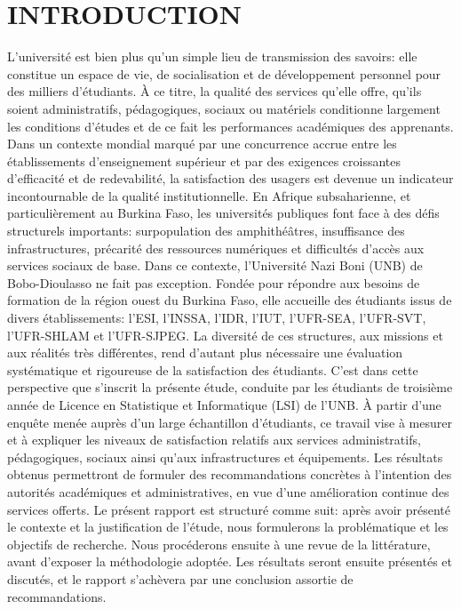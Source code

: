 \documentclass[
12pt,          %
a4paper,       %
oneside,      %
openright      %
]{report}          %
\begin{document}
		\chapter*{INTRODUCTION}
			L'université est bien plus qu'un simple lieu de transmission des savoirs: elle constitue un
		espace de vie, de socialisation et de développement personnel pour des milliers d'étudiants.
		À ce titre, la qualité des services qu'elle offre, qu'ils soient administratifs, pédagogiques, sociaux ou matériels conditionne largement les conditions d'études et de ce fait les performances académiques des apprenants. Dans un contexte mondial marqué par une concurrence accrue entre les établissements d'enseignement supérieur et par des exigences croissantes d'efficacité et de redevabilité, la satisfaction des usagers est devenue un indicateur incontournable de la qualité institutionnelle.
		En Afrique subsaharienne, et particulièrement au Burkina Faso, les universités publiques font
		face à des défis structurels importants: surpopulation des amphithéâtres, insuffisance des
		infrastructures, précarité des ressources numériques et difficultés d'accès aux services
		sociaux de base. Dans ce contexte, l'Université Nazi Boni (UNB) de Bobo-Dioulasso ne fait
		pas exception. Fondée pour répondre aux besoins de formation de la région ouest du Burkina
		Faso, elle accueille des étudiants issus de divers établissements: l'ESI, l'INSSA, l'IDR,
		l'IUT, l'UFR-SEA, l'UFR-SVT, l'UFR-SHLAM et l'UFR-SJPEG. La diversité de ces structures,
		aux missions et aux réalités très différentes, rend d'autant plus nécessaire une évaluation
		systématique et rigoureuse de la satisfaction des étudiants.
		C'est dans cette perspective que s'inscrit la présente étude, conduite par les étudiants de
		troisième année de Licence en Statistique et Informatique (LSI) de l'UNB. À partir d'une
		enquête menée auprès d'un large échantillon d'étudiants, ce travail vise à mesurer et à
		expliquer les niveaux de satisfaction relatifs aux services administratifs, pédagogiques,
		sociaux ainsi qu'aux infrastructures et équipements. Les résultats obtenus permettront de
		formuler des recommandations concrètes à l'intention des autorités académiques et
		administratives, en vue d'une amélioration continue des services offerts.
		Le présent rapport est structuré comme suit: après avoir présenté le contexte et la
		justification de l'étude, nous formulerons la problématique et les objectifs de recherche.
		Nous procéderons ensuite à une revue de la littérature, avant d'exposer la méthodologie
		adoptée. Les résultats seront ensuite présentés et discutés, et le rapport s'achèvera par
		une conclusion assortie de recommandations.
		\vspace{12pt}
		\cleardoublepage
		
\end{document}
